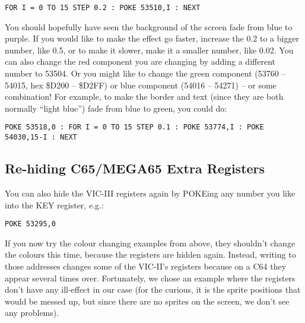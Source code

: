 \begin{tcolorbox}[colback=black,coltext=white]
\verbatimfont{\codefont}
\begin{verbatim}
FOR I = 0 TO 15 STEP 0.2 : POKE 53510,I : NEXT
\end{verbatim}
\end{tcolorbox}

You should hopefully have seen the background of the screen fade from blue to purple.  If you would like to
make the effect go faster, increase the 0.2 to a bigger number, like 0.5, or to make it slower, make it a smaller number, like 0.02.
You can also change the red component you are changing by adding a different number to 53504.  Or you might like to change the green
component (53760 -- 54015, hex \$D200 -- \$D2FF) or blue component (54016 -- 54271) -- or some combination!  For example, to make
the border and text (since they are both normally ``light blue'') fade from blue to green, you could do:

\begin{tcolorbox}[colback=black,coltext=white]
\verbatimfont{\codefont}
\begin{verbatim}
POKE 53518,0 : FOR I = 0 TO 15 STEP 0.1 : POKE 53774,I : POKE 54030,15-I : NEXT
\end{verbatim}
\end{tcolorbox}

\subsection{Re-hiding C65/MEGA65 Extra Registers}

You can also hide the VIC-III registers again by POKEing any number you like into the KEY register, e.g.:

\begin{tcolorbox}[colback=black,coltext=white]
\verbatimfont{\codefont}
\begin{verbatim}
POKE 53295,0
\end{verbatim}
\end{tcolorbox}

If you now try the colour changing examples from above, they shouldn't change the colours this time, because
the registers are hidden again. Instead, writing to those addresses changes some of the VIC-II's registers
because on a C64 they appear several times over.  Fortunately, we chose an example where the registers don't
have any ill-effect in our case (for the curious, it is the sprite positions that would be messed up, but
since there are no sprites on the screen, we don't see any problems).

